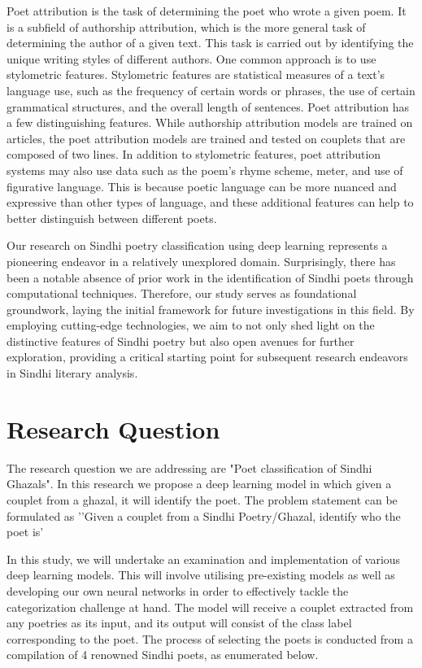 \documentclass[conference]{IEEEtran}
\begin{document}
Poet attribution is the task of determining the poet who wrote a given poem. It is a subfield of authorship attribution, which is the more general task of determining the author of a given text. This task is carried out by identifying the unique writing styles of different authors. One common approach is to use stylometric features. Stylometric features are statistical measures of a text's language use, such as the frequency of certain words or phrases, the use of certain grammatical structures, and the overall length of sentences. Poet attribution has a few distinguishing features. While authorship attribution models are trained on articles, the poet attribution models are trained and tested on couplets that are composed of two lines. In addition to stylometric features, poet attribution systems may also use data such as the poem's rhyme scheme, meter, and use of figurative language. This is because poetic language can be more nuanced and expressive than other types of language, and these additional features can help to better distinguish between different poets.
\par
Our research on Sindhi poetry classification using deep learning represents a pioneering endeavor in a relatively unexplored domain. Surprisingly, there has been a notable absence of prior work in the identification of Sindhi poets through computational techniques. Therefore, our study serves as foundational groundwork, laying the initial framework for future investigations in this field. By employing cutting-edge technologies, we aim to not only shed light on the distinctive features of Sindhi poetry but also open avenues for further exploration, providing a critical starting point for subsequent research endeavors in Sindhi literary analysis.

\section{Research Question}

The research question we are addressing are "Poet classification of Sindhi Ghazals". In this research we propose a deep learning model in which given a couplet from a ghazal, it will identify the poet. The problem statement can be formulated as
\newline '’Given a couplet from a Sindhi Poetry/Ghazal, identify who the poet is’
\newline
\par
In this study, we will undertake an examination and implementation of various deep learning models. This will involve utilising pre-existing models as well as developing our own neural networks in order to effectively tackle the categorization challenge at hand. The model will receive a couplet extracted from any poetries as its input, and its output will consist of the class label corresponding to the poet. The process of selecting the poets is conducted from a compilation of 4 renowned Sindhi poets, as enumerated below.
\end{document}

